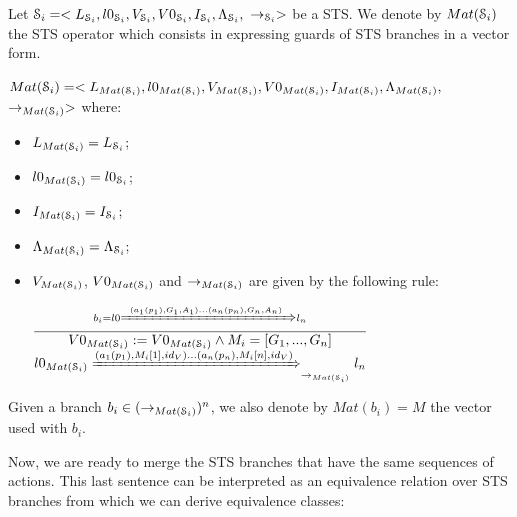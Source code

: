 \begin{definition}
\label{rule:matrix}
  Let $\EuScript{S}_i=<L_{\EuScript{S}_i},l0_{\EuScript{S}_i},V_{\EuScript{S}_i},V0_{\EuScript{S}_i},I_{\EuScript{S}_i},\Lambda_{\EuScript{S}_i},$
  $\rightarrow_{\EuScript{S}_i}>$ be a STS. We denote by
  $Mat(\EuScript{S}_i)$ the STS operator which consists in
  expressing guards of STS branches in a vector form.

  $Mat(\EuScript{S}_i)=<L_{Mat(\EuScript{S}_i)},l0_{Mat(\EuScript{S}_i)},V_{Mat(\EuScript{S}_i)},V0_{Mat(\EuScript{S}_i)},I_{Mat(\EuScript{S}_i)},\Lambda_{Mat(\EuScript{S}_i)},$
  $\rightarrow_{Mat(\EuScript{S}_i)}>$ where:

	\begin{itemize}
    \item $L_{Mat(\EuScript{S}_i)}=L_{\EuScript{S}_i}$;
    \item $l0_{Mat(\EuScript{S}_i)}=l0_{\EuScript{S}_i}$;
    \item $I_{Mat(\EuScript{S}_i)}=I_{\EuScript{S}_i}$;
    \item $\Lambda_{Mat(\EuScript{S}_i)} = \Lambda_{\EuScript{S}_i}$;

    \item $V_{Mat(\EuScript{S}_i)}$, $V0_{Mat(\EuScript{S}_i)}$
      and $\rightarrow_{Mat(\EuScript{S}_i)}$ are given by the
      following rule:

    \begin{center}
    {\Large
    $\frac{b_i=l0 \xRightarrow{(a_1(p_1),G_1,A_1)...(a_n(p_n),G_n,A_n)} l_n}{
      \begin{matrix}
        V0_{Mat(\EuScript{S}_i)}:=V0_{Mat(\EuScript{S}_i)} \wedge M_{i}=[G_1,...,G_n]\\
        l0_{Mat(\EuScript{S}_i)} \xRightarrow{(a_1(p_1),M_i[1],id_V) ...(a_n(p_n),M_i[n],id_V) }_{\rightarrow_{Mat(\EuScript{S}_i)}} l_n\\
      \end{matrix}
    }$
    }
    \end{center}
  \end{itemize}

  Given a branch $b_i \in (\rightarrow_{Mat(\EuScript{S}_i)})^n$,
  we also denote by $Mat(b_i)=M$ the vector used with $b_i$.
\end{definition}

Now, we are ready to merge the STS branches that have the same
sequences of actions. This last sentence can be interpreted as an
equivalence relation over STS branches from which we can derive
equivalence classes:

